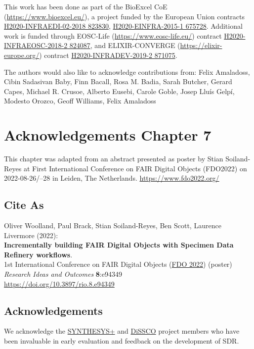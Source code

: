 This work has been done as part of the BioExcel CoE
(\url{https://www.bioexcel.eu/}), a project funded by the European Union
contracts
\href{https://cordis.europa.eu/project/id/823830}{H2020-INFRAEDI-02-2018
823830},
\href{https://cordis.europa.eu/project/id/675728}{H2020-EINFRA-2015-1
675728}. Additional work is funded through EOSC-Life
(\url{https://www.eosc-life.eu/}) contract
\href{https://cordis.europa.eu/project/id/824087}{H2020-INFRAEOSC-2018-2
824087}, and ELIXIR-CONVERGE (\url{https://elixir-europe.org/}) contract
\href{https://cordis.europa.eu/project/id/871075}{H2020-INFRADEV-2019-2
871075}.

The authors would also like to acknowledge contributions from: Felix
Amaladoss, Cibin Sadasivan Baby, Finn Bacall, Rosa M. Badia, Sarah
Butcher, Gerard Capes, Michael R. Crusoe, Alberto Eusebi, Carole Goble,
Josep Lluís Gelpí, Modesto Orozco, Geoff Williams, Felix Amaladoss



\section{Acknowledgements Chapter 7}

This chapter was adapted from an abstract
presented as poster by Stian Soiland-Reyes at 
First International Conference on FAIR Digital Objects 
(FDO2022) on
2022-08-26/--28 in Leiden, The Netherlands. 
\url{https://www.fdo2022.org/}

\subsection*{Cite As}

Oliver Woolland, Paul Brack, Stian Soiland-Reyes, Ben Scott, Laurence
Livermore (2022):\\
\textbf{Incrementally building FAIR Digital Objects with Specimen Data
Refinery workflows}.\\
1st International Conference on FAIR Digital Objects
(\href{https://www.fdo2022.org/}{FDO 2022}) (poster)\\
\emph{Research Ideas and Outcomes} \textbf{8}:e94349\\
\url{https://doi.org/10.3897/rio.8.e94349}


\subsection*{Acknowledgements}

We acknowledge the \href{https://www.synthesys.info/}{SYNTHESYS+} and
\href{https://www.dissco.eu/}{DiSSCO} project members who have been
invaluable in early evaluation and feedback on the development of SDR.

